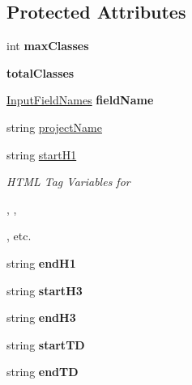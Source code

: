 \subsection*{Protected Attributes}
\begin{DoxyCompactItemize}
\item 
\hypertarget{classClassDetails_aac62f884df52547b243e590f821fea73}{int {\bfseries max\-Classes}}\label{classClassDetails_aac62f884df52547b243e590f821fea73}

\item 
\hypertarget{classClassDetails_abeaf3f58e354889726cbd43303a968b9}{{\bfseries total\-Classes}}\label{classClassDetails_abeaf3f58e354889726cbd43303a968b9}

\item 
\hypertarget{classClassDetails_a53e447a55d35c02dcb02c6553380697e}{\hyperlink{classInputFieldNames}{Input\-Field\-Names} {\bfseries field\-Name}}\label{classClassDetails_a53e447a55d35c02dcb02c6553380697e}

\item 
string \hyperlink{classPageLayout_a8a3c1ddc422df2556fbc95d0cd575a05}{project\-Name}
\item 
string \hyperlink{classHTMLTags_ae987289d0dab2e3e234048615f930d0f}{start\-H1}
\begin{DoxyCompactList}\small\item\em H\-T\-M\-L Tag Variables for 

, , 

, etc. \end{DoxyCompactList}\item 
\hypertarget{classHTMLTags_a708194dea85c068a24b7923254fd7458}{string {\bfseries end\-H1}}\label{classHTMLTags_a708194dea85c068a24b7923254fd7458}

\item 
\hypertarget{classHTMLTags_a9290221d987dfe55acd3d2002a48efa0}{string {\bfseries start\-H3}}\label{classHTMLTags_a9290221d987dfe55acd3d2002a48efa0}

\item 
\hypertarget{classHTMLTags_afa471891c94946ba4a68acd727246d66}{string {\bfseries end\-H3}}\label{classHTMLTags_afa471891c94946ba4a68acd727246d66}

\item 
\hypertarget{classHTMLTags_a827d77a9a5cc3c442421420f0713c17a}{string {\bfseries start\-T\-D}}\label{classHTMLTags_a827d77a9a5cc3c442421420f0713c17a}

\item 
\hypertarget{classHTMLTags_ac2f4aae38f9d88d90df443e1e59a5bfc}{string {\bfseries end\-T\-D}}\label{classHTMLTags_ac2f4aae38f9d88d90df443e1e59a5bfc}


\end{DoxyCompactItemize}
